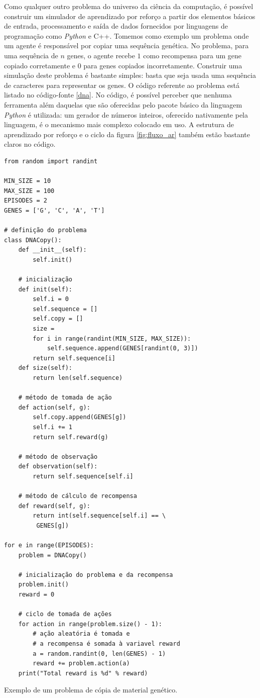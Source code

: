 \documentclass[cic,tc]{iiufrgs}
\newenvironment{longlisting}{\captionsetup{type=listing}}{}
\begin{document}
Como qualquer outro problema do universo da ciência da computação, é possível
construir um simulador de aprendizado por reforço a partir dos elementos básicos
de entrada, processamento e saída de dados fornecidos por linguagens de
programação como \textit{Python} e C++. Tomemos como exemplo um problema onde um
agente é responsável por copiar uma sequência genética. No problema, para uma
sequência de $n$ genes, o agente recebe $1$ como recompensa para um gene copiado
corretamente e $0$ para genes copiados incorretamente. Construir uma simulação
deste problema é bastante simples: basta que seja usada uma sequência de
caracteres para representar os genes. O código referente ao
problema está listado no código-fonte \ref{dna}. No código, é possível perceber
que nenhuma ferramenta além daquelas que são oferecidas pelo pacote básico da
linguagem \textit{Python} é utilizada: um gerador de números inteiros, oferecido
nativamente pela linguagem, é o mecanismo mais complexo colocado em uso. A
estrutura de aprendizado por reforço e o ciclo da figura \ref{fig:fluxo_ar} também
estão bastante claros no código.

\begin{longlisting}
\begin{verbatim}
from random import randint

MIN_SIZE = 10
MAX_SIZE = 100
EPISODES = 2
GENES = ['G', 'C', 'A', 'T']

# definição do problema
class DNACopy():
    def __init__(self):
        self.init()

    # inicialização
    def init(self):
        self.i = 0
        self.sequence = []
        self.copy = []
        size =
        for i in range(randint(MIN_SIZE, MAX_SIZE)):
            self.sequence.append(GENES[randint(0, 3)])
        return self.sequence[i]
    def size(self):
        return len(self.sequence)

    # método de tomada de ação
    def action(self, g):
        self.copy.append(GENES[g])
        self.i += 1
        return self.reward(g)

    # método de observação
    def observation(self):
        return self.sequence[self.i]

    # método de cálculo de recompensa
    def reward(self, g):
        return int(self.sequence[self.i] == \
         GENES[g])

for e in range(EPISODES):
    problem = DNACopy()

    # inicialização do problema e da recompensa
    problem.init()
    reward = 0

    # ciclo de tomada de ações
    for action in range(problem.size() - 1):
        # ação aleatória é tomada e
        # a recompensa é somada à variavel reward
        a = random.randint(0, len(GENES) - 1)
        reward += problem.action(a)
    print("Total reward is %d" % reward)

\end{verbatim}
\caption[Cópia de DNA]{Exemplo de um problema de cópia de material genético.}
\label{dna}
\end{longlisting}
\end{document}
